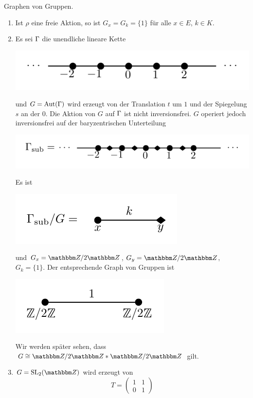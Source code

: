 \documentclass[a4paper, 12pt, twoside]{article}
\begin{document}
\BSP Graphen von Gruppen.
\begin{enumerate}
\item Ist $\rho$ eine freie Aktion, so ist $G_x=G_k=\{1\}$ für
alle $x\in E$, $k\in K$.
\item Es sei $\Gamma$ die unendliche lineare Kette
\begin{center}
	\includegraphics{grugraImages/cay1}
\end{center}
und $G=\mathrm{Aut}(\Gamma)$ wird erzeugt von der Translation $t$ um $1$ und
der Spiegelung $s$ an der $0$. Die Aktion von $G$ auf $\Gamma$ ist nicht
inversionsfrei. $G$ operiert jedoch inversionsfrei auf
der baryzentrischen Unterteilung
\begin{center}
	\includegraphics{grugraImages/cay1sub}
\end{center}
Es ist
\begin{center}
	\includegraphics{grugraImages/cay1subquot}
\end{center}
und $G_x=\ZZ/2\ZZ$, $G_y=\ZZ/2\ZZ$, $G_k=\{1\}$.
Der entsprechende Graph von Gruppen ist
\begin{center}
	\includegraphics{grugraImages/GvG1}
\end{center}
Wir werden später sehen, dass $G\cong \ZZ/2\ZZ*\ZZ/2\ZZ$ gilt.
\item $G=\SL_2(\ZZ)$ wird erzeugt von
\[
T=\begin{pmatrix}
1 & 1 \\ 0 & 1

\end{pmatrix}\]
\end{enumerate}
\end{document}
